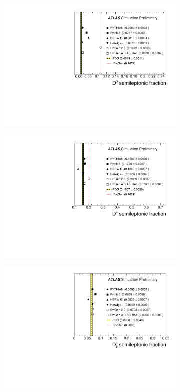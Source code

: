 \begin{figure}
\centering
\begin{subfigure}[]{0.45\textwidth}
\includegraphics[width=\textwidth]{evtgen/figures/EvtGen/h_D0_sl.pdf}
\end{subfigure}
\begin{subfigure}[]{0.45\textwidth}
\includegraphics[width=\textwidth]{evtgen/figures/EvtGen/h_D_sl.pdf}
\end{subfigure}
\begin{subfigure}[]{0.45\textwidth}
\includegraphics[width=\textwidth]{evtgen/figures/EvtGen/h_Ds_sl.pdf}

\end{subfigure}
\end{figure}

